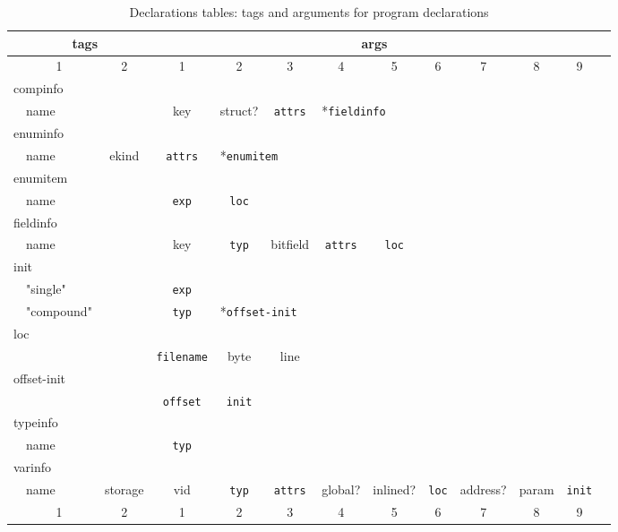 \documentclass[11pt]{article}
\begin{document}
\begin{table}
\centering
\small
\begin{tabular}{l|l|c||c|c|c|c|c|c|c|c|c|l}
&\multicolumn{2}{c||}{tags} & \multicolumn{9}{|c|}{args}   \\ \hline
&\multicolumn{1}{c|}{1} & 2 & 1 & 2 & 3 & 4 & 5 & 6 & 7 & 8 & 9 \\ \hline 
\multicolumn{12}{l}{compinfo} \\ \hline
& name & & key & struct? & {\tt attrs} & \multicolumn{6}{|l|}{*{\tt fieldinfo}} \\ \hline
\multicolumn{12}{l}{enuminfo} \\ \hline
& name & ekind & {\tt attrs} & \multicolumn{8}{|l|}{*{\tt enumitem}} \\ \hline
\multicolumn{12}{l}{enumitem} \\ \hline
& name & & {\tt exp} & {\tt loc} & & & & & & & \\ \hline
\multicolumn{12}{l}{fieldinfo} \\ \hline
& name & & key & {\tt typ} & bitfield & {\tt attrs} & {\tt loc} & & & & \\ \hline
\multicolumn{12}{l}{init} \\ \hline
& "single" & & {\tt exp} & \multicolumn{8}{|l|}{\mbox{}} \\
& "compound" & & {\tt typ} & \multicolumn{8}{|l|}{*{\tt offset-init}} \\ \hline
\multicolumn{12}{l}{loc} \\ \hline
& & & {\tt filename} & byte & line & & & & & &\\ \hline
\multicolumn{12}{l}{offset-init} \\ \hline
& & & {\tt offset} & {\tt init} & & & & & & & \\ \hline
\multicolumn{12}{l}{typeinfo} \\ \hline
& name & & {\tt typ} & & & & & & & & \\ \hline
\multicolumn{12}{l}{varinfo} \\ \hline
& name & storage & vid & {\tt typ} & {\tt attrs} & global? & inlined? & {\tt loc} &
   address? & param & {\tt init} \\ \hline
&\multicolumn{1}{c|}{1} & 2 & 1 & 2 & 3 & 4 & 5 & 6 & 7 & 8 & 9 \\ \hline 
\end{tabular}
\caption{\label{tab:decls}Declarations tables: tags and arguments for program declarations}
\end{table}


\end{document}
